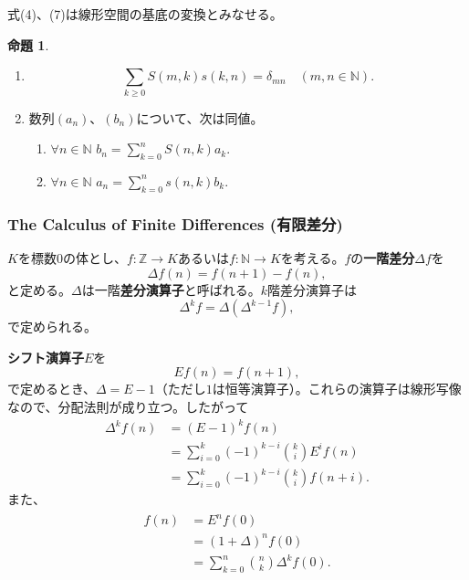 \documentclass[xelatex,ja=standard,a4paper,14pt,everyparhook=compat]{bxjsarticle}
\newcommand{\bbN}{\mathbb{N}}
\newcommand{\bbZ}{\mathbb{Z}}
\theoremstyle{definition}
\newtheorem{proposition}[theorem]{命題}
\begin{document}
式(4)、(7)は線形空間の基底の変換とみなせる。

\begin{proposition}
    \begin{enumerate}
        \item \begin{equation*}
                  \sum_{k \geq 0} S(m,k) s(k,n) = \delta_{mn} \quad (m,n \in \bbN).
              \end{equation*}
        \item 数列$(a_n)$、$(b_n)$について、次は同値。 \begin{enumerate}[label=(\roman*)]
                  \item $\forall n \in \bbN$ $b_n = \sum_{k=0}^n S(n,k) a_k$.
                  \item $\forall n \in \bbN$ $a_n = \sum_{k=0}^n s(n,k) b_k$.
              \end{enumerate}
    \end{enumerate}
\end{proposition}

\subsubsection*{The Calculus of Finite Differences (有限差分)}

$K$を標数$0$の体とし、$f: \bbZ \to K$あるいは$f: \bbN \to K$を考える。$f$の\textbf{一階差分}$\Delta f$を \begin{equation*}
    \Delta f(n) = f(n+1) - f(n),
\end{equation*}
と定める。$\Delta$は一階\textbf{差分演算子}と呼ばれる。$k$階差分演算子は \begin{equation*}
    \Delta^k f = \Delta(\Delta^{k-1} f),
\end{equation*}
で定められる。

\textbf{シフト演算子}$E$を \begin{equation*}
    E f(n) = f(n+1),
\end{equation*}
で定めるとき、$\Delta = E - 1$（ただし$1$は恒等演算子）。これらの演算子は線形写像なので、分配法則が成り立つ。したがって \begin{align*}
    \Delta^k f(n) &= (E-1)^k f(n) \\
    &= \sum_{i=0}^k (-1)^{k-i} \binom{k}{i} E^i f(n) \\
    &= \sum_{i=0}^k (-1)^{k-i} \binom{k}{i} f(n+i).
\end{align*}
また、 \begin{gather} \label{Taylor}
    \begin{aligned}
        f(n) &= E^n f(0) \\
        &= (1+\Delta)^n f(0) \\
        &= \sum_{k=0}^n \binom{n}{k} \Delta^k f(0).
    \end{aligned}
\end{gather}
\end{document}
